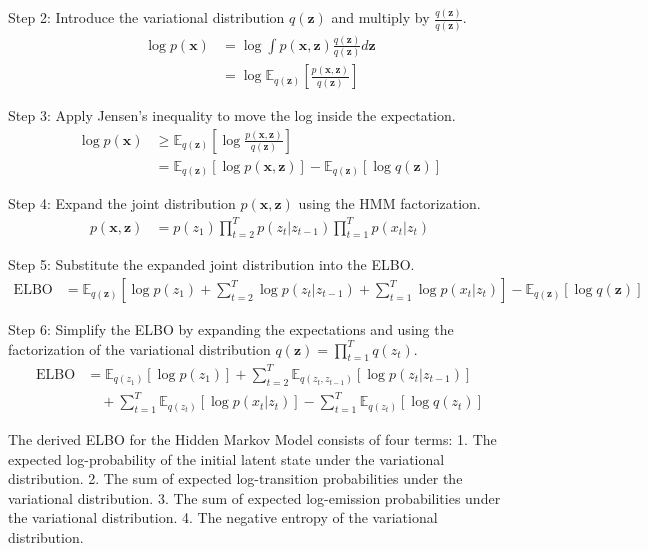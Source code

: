 \documentclass[11pt]{article}
\begin{document}
    Step 2: Introduce the variational distribution $q(\mathbf{z})$ and multiply by $\frac{q(\mathbf{z})}{q(\mathbf{z})}$.
    \begin{align*}
        \log p(\mathbf{x}) &= \log \int p(\mathbf{x}, \mathbf{z}) \frac{q(\mathbf{z})}{q(\mathbf{z})} d\mathbf{z} \\
        &= \log \mathbb{E}_{q(\mathbf{z})} \left[ \frac{p(\mathbf{x}, \mathbf{z})}{q(\mathbf{z})} \right]
    \end{align*}

    Step 3: Apply Jensen's inequality to move the log inside the expectation.
    \begin{align*}
        \log p(\mathbf{x}) &\geq \mathbb{E}_{q(\mathbf{z})} \left[ \log \frac{p(\mathbf{x}, \mathbf{z})}{q(\mathbf{z})} \right] \\
        &= \mathbb{E}_{q(\mathbf{z})} [\log p(\mathbf{x}, \mathbf{z})] - \mathbb{E}_{q(\mathbf{z})} [\log q(\mathbf{z})]
    \end{align*}

    Step 4: Expand the joint distribution $p(\mathbf{x}, \mathbf{z})$ using the HMM factorization.
    \begin{align*}
        p(\mathbf{x}, \mathbf{z}) &= p(z_1) \prod_{t=2}^T p(z_t | z_{t-1}) \prod_{t=1}^T p(x_t | z_t)
    \end{align*}

    Step 5: Substitute the expanded joint distribution into the ELBO.
    \begin{align*}
        \text{ELBO} &= \mathbb{E}_{q(\mathbf{z})} \left[ \log p(z_1) + \sum_{t=2}^T \log p(z_t | z_{t-1}) + \sum_{t=1}^T \log p(x_t | z_t) \right] - \mathbb{E}_{q(\mathbf{z})} [\log q(\mathbf{z})]
    \end{align*}

    Step 6: Simplify the ELBO by expanding the expectations and using the factorization of the variational distribution $q(\mathbf{z}) = \prod_{t=1}^T q(z_t)$.
    \begin{align*}
        \text{ELBO} &= \mathbb{E}_{q(z_1)} [\log p(z_1)] + \sum_{t=2}^T \mathbb{E}_{q(z_t, z_{t-1})} [\log p(z_t | z_{t-1})] \\
        &\quad + \sum_{t=1}^T \mathbb{E}_{q(z_t)} [\log p(x_t | z_t)] - \sum_{t=1}^T \mathbb{E}_{q(z_t)} [\log q(z_t)]
    \end{align*}

    The derived ELBO for the Hidden Markov Model consists of four terms:
    1. The expected log-probability of the initial latent state under the variational distribution.
    2. The sum of expected log-transition probabilities under the variational distribution.
    3. The sum of expected log-emission probabilities under the variational distribution.
    4. The negative entropy of the variational distribution.
\end{document}
